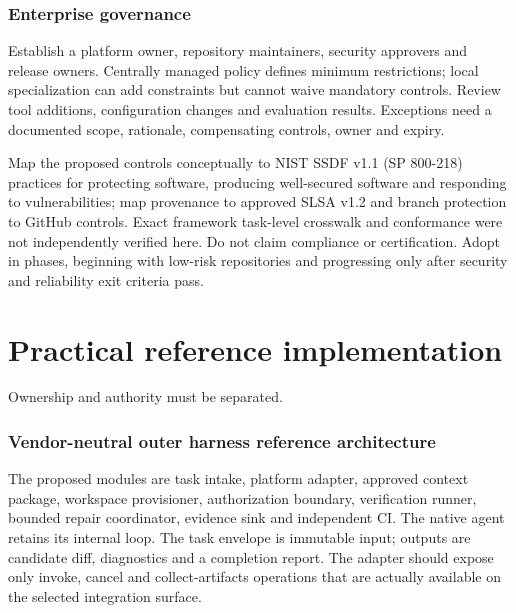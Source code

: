\documentclass[11pt,letterpaper]{article}
\begin{document}
\section{Enterprise governance}
Establish a platform owner, repository maintainers, security approvers and release owners. Centrally managed policy defines minimum restrictions; local specialization can add constraints but cannot waive mandatory controls. Review tool additions, configuration changes and evaluation results. Exceptions need a documented scope, rationale, compensating controls, owner and expiry.

Map the proposed controls conceptually to NIST SSDF v1.1 (SP 800-218) practices for protecting software, producing well-secured software and responding to vulnerabilities; map provenance to approved SLSA v1.2 and branch protection to GitHub controls. Exact framework task-level crosswalk and conformance were not independently verified here. Do not claim compliance or certification. \cite{github,nist,slsa} Adopt in phases, beginning with low-risk repositories and progressing only after security and reliability exit criteria pass.

\clearpage\part{Practical reference implementation}
\begin{center}\begin{minipage}{\linewidth}\captionsetup{type=figure}\centering{}\caption{Enterprise governance architecture}
\small Ownership and authority must be separated.\end{minipage}\end{center}
\section{Vendor-neutral outer harness reference architecture}
The proposed modules are task intake, platform adapter, approved context package, workspace provisioner, authorization boundary, verification runner, bounded repair coordinator, evidence sink and independent CI. The native agent retains its internal loop. The task envelope is immutable input; outputs are candidate diff, diagnostics and a completion report. The adapter should expose only invoke, cancel and collect-artifacts operations that are actually available on the selected integration surface.
\end{document}
